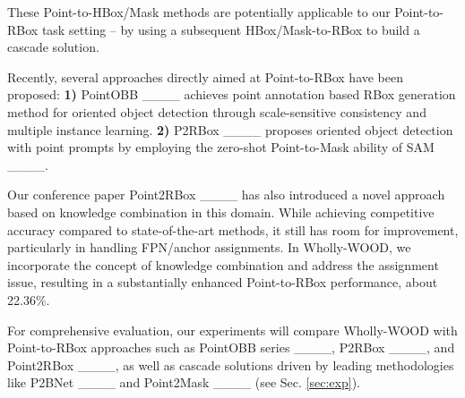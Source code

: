 These Point-to-HBox/Mask methods are potentially applicable to our Point-to-RBox task setting -- by using a subsequent HBox/Mask-to-RBox to build a cascade solution. 

Recently, several approaches directly aimed at Point-to-RBox have been proposed: \textbf{1)} PointOBB ____ achieves point annotation based RBox generation method for oriented object detection through scale-sensitive consistency and multiple instance learning. \textbf{2)} P2RBox ____ proposes oriented object detection with point prompts by employing the zero-shot Point-to-Mask ability of SAM ____.

Our conference paper Point2RBox ____ has also introduced a novel approach based on knowledge combination in this domain. While achieving competitive accuracy compared to state-of-the-art methods, it still has room for improvement, particularly in handling FPN/anchor assignments. In Wholly-WOOD, we incorporate the concept of knowledge combination and address the assignment issue, resulting in a substantially enhanced Point-to-RBox performance, about 22.36\%.

For comprehensive evaluation, our experiments will compare Wholly-WOOD with Point-to-RBox approaches such as PointOBB series ____, P2RBox ____, and Point2RBox ____, as well as cascade solutions driven by leading methodologies like P2BNet ____ and Point2Mask ____ (see Sec. \ref{sec:exp}).